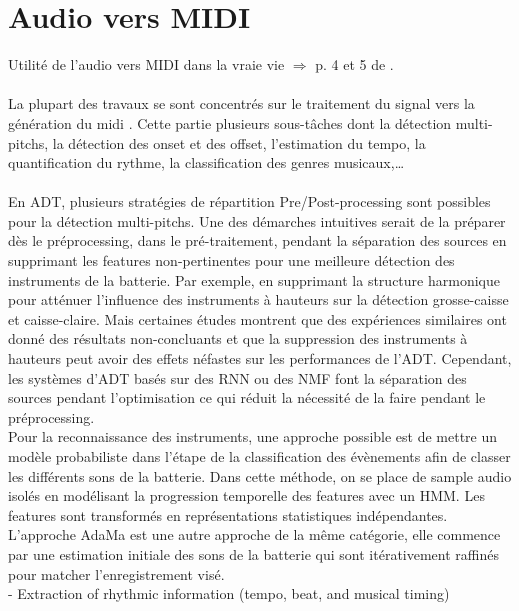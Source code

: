 \section{Audio vers MIDI}
Utilité de l’audio vers MIDI dans la vraie vie $\Rightarrow$ p. 4 et 5 de \cite{Review_ADT}.\\\\
La plupart des travaux se sont concentrés sur le traitement du signal vers la génération du midi \cite{AMT_for_2_Instru}. Cette partie plusieurs sous-tâches dont la détection multi-pitchs, la détection des onset et des offset, l'estimation du tempo, la quantification du rythme, la classification des genres musicaux,…\\\\
En ADT\cite{Review_ADT}, plusieurs stratégies de répartition Pre/Post-processing sont possibles pour la détection multi-pitchs. Une des démarches intuitives serait de la préparer dès le préprocessing, dans le pré-traitement, pendant la séparation des sources en supprimant les features non-pertinentes pour une meilleure détection des instruments de la batterie. Par exemple, en supprimant la structure harmonique pour atténuer l’influence des instruments à hauteurs sur la détection grosse-caisse et caisse-claire. Mais certaines études montrent que des expériences similaires ont donné des résultats non-concluants et que la suppression des instruments à hauteurs peut avoir des effets néfastes sur les performances de l’ADT. Cependant, les systèmes d’ADT basés sur des RNN ou des NMF font la séparation des sources pendant l’optimisation ce qui réduit la nécessité de la faire pendant le préprocessing.\\
Pour la reconnaissance des instruments, une approche possible\cite{Eronen} est de mettre un modèle probabiliste dans l’étape de la classification des évènements afin de classer les différents sons de la batterie. Dans cette méthode, on se place de sample audio isolés en modélisant la progression temporelle des features avec un HMM. Les features sont transformés en représentations statistiques indépendantes.
L’approche AdaMa\cite{adama_1} est une autre approche de la même catégorie, elle commence par une estimation initiale des sons de la batterie qui sont itérativement raffinés pour matcher l’enregistrement visé.\\
- Extraction of rhythmic information (tempo, beat, and musical timing)\\
